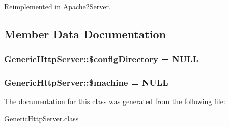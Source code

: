 Reimplemented in \hyperlink{classApache2Server_ad0fc9b83e68c5527ccdf7d612daad5c1}{Apache2\-Server}.



\subsection{Member Data Documentation}
\hypertarget{classGenericHttpServer_a1677999959523d4b71f1514a99477378}{
\subsubsection[{\$config\-Directory}]{\setlength{\rightskip}{0pt plus 5cm}Generic\-Http\-Server\-::\$config\-Directory = N\-U\-L\-L\hspace{0.3cm}{\ttfamily [private]}}}\label{classGenericHttpServer_a1677999959523d4b71f1514a99477378}
\hypertarget{classGenericHttpServer_a9a5d02005d44f2d86b51c41e5f392594}{
\subsubsection[{\$machine}]{\setlength{\rightskip}{0pt plus 5cm}Generic\-Http\-Server\-::\$machine = N\-U\-L\-L\hspace{0.3cm}{\ttfamily [private]}}}\label{classGenericHttpServer_a9a5d02005d44f2d86b51c41e5f392594}


The documentation for this class was generated from the following file\-:\begin{DoxyCompactItemize}
\item 
\hyperlink{GenericHttpServer_8class}{Generic\-Http\-Server.\-class}\end{DoxyCompactItemize}
